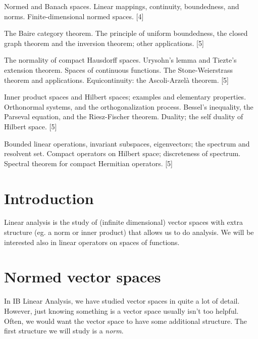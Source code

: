 \documentclass[a4paper]{article}
\begin{document}
\maketitle
{\small
\noindent Normed and Banach spaces. Linear mappings, continuity, boundedness, and norms. Finite-dimensional normed spaces.\hspace*{\fill} [4]

\vspace{5pt}
\noindent The Baire category theorem. The principle of uniform boundedness, the closed graph theorem and the inversion theorem; other applications.\hspace*{\fill} [5]

\vspace{5pt}
\noindent The normality of compact Hausdorff spaces. Urysohn's lemma and Tiezte's extension theorem. Spaces of continuous functions. The Stone-Weierstrass theorem and applications. Equicontinuity: the Ascoli-Arzel\`a theorem.\hspace*{\fill} [5]

\vspace{5pt}
\noindent Inner product spaces and Hilbert spaces; examples and elementary properties. Orthonormal systems, and the orthogonalization process. Bessel's inequality, the Parseval equation, and the Riesz-Fischer theorem. Duality; the self duality of Hilbert space.\hspace*{\fill} [5]

\vspace{5pt}
\noindent Bounded linear operations, invariant subspaces, eigenvectors; the spectrum and resolvent set. Compact operators on Hilbert space; discreteness of spectrum. Spectral theorem for compact Hermitian operators.\hspace*{\fill} [5]}

\tableofcontents

\setcounter{section}{-1}
\section{Introduction}
Linear analysis is the study of (infinite dimensional) vector spaces with extra structure (eg. a norm or inner product) that allows us to do analysis. We will be interested also in linear operators on spaces of functions.

\section{Normed vector spaces}
In IB Linear Analysis, we have studied vector spaces in quite a lot of detail. However, just knowing something is a vector space usually isn't too helpful. Often, we would want the vector space to have some additional structure. The first structure we will study is a \emph{norm}.
\end{document}
